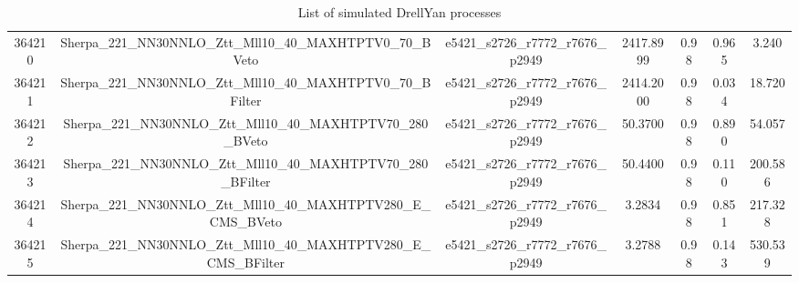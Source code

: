\begin{table}[htbp]
\begin{center}
{\begin{tabular}{ccccccc}
364210 & Sherpa\_221\_NN30NNLO\_Ztt\_Mll10\_40\_MAXHTPTV0\_70\_BVeto & e5421\_s2726\_r7772\_r7676\_p2949 & 2417.8999 & 0.98 & 0.965 & 3.240 \\ 
364211 & Sherpa\_221\_NN30NNLO\_Ztt\_Mll10\_40\_MAXHTPTV0\_70\_BFilter & e5421\_s2726\_r7772\_r7676\_p2949 & 2414.2000 & 0.98 & 0.034 & 18.720 \\ 
364212 & Sherpa\_221\_NN30NNLO\_Ztt\_Mll10\_40\_MAXHTPTV70\_280\_BVeto & e5421\_s2726\_r7772\_r7676\_p2949 & 50.3700 & 0.98 & 0.890 & 54.057 \\ 
364213 & Sherpa\_221\_NN30NNLO\_Ztt\_Mll10\_40\_MAXHTPTV70\_280\_BFilter & e5421\_s2726\_r7772\_r7676\_p2949 & 50.4400 & 0.98 & 0.110 & 200.586 \\ 
364214 & Sherpa\_221\_NN30NNLO\_Ztt\_Mll10\_40\_MAXHTPTV280\_E\_CMS\_BVeto & e5421\_s2726\_r7772\_r7676\_p2949 & 3.2834 & 0.98 & 0.851 & 217.328 \\ 
364215 & Sherpa\_221\_NN30NNLO\_Ztt\_Mll10\_40\_MAXHTPTV280\_E\_CMS\_BFilter & e5421\_s2726\_r7772\_r7676\_p2949 & 3.2788 & 0.98 & 0.143 & 530.539 \\ 
\hline
\end{tabular}}
\end{center}
\caption{List of simulated DrellYan processes}
\label{table:drellyan}
\end{table} 
